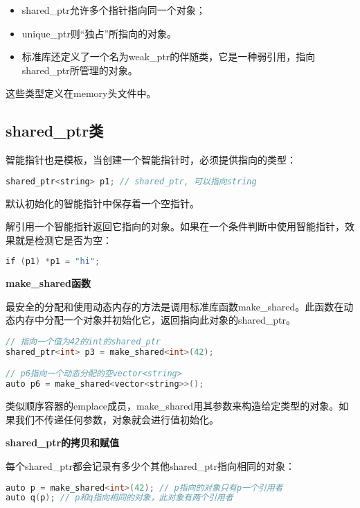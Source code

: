 \documentclass[
  a4paper,
  oneside,tablecaptionabove
]{scrbook}
\begin{document}
\begin{itemize}
\item
  shared\_ptr允许多个指针指向同一个对象；
\item
  unique\_ptr则\enquote{独占}所指向的对象。
\item
  标准库还定义了一个名为weak\_ptr的伴随类，它是一种弱引用，指向shared\_ptr所管理的对象。
\end{itemize}

这些类型定义在memory头文件中。

\subsection{shared\_ptr类}\label{shared_ptrux7c7b}

智能指针也是模板，当创建一个智能指针时，必须提供指向的类型：

\begin{lstlisting}[language={C++}]
shared_ptr<string> p1; // shared_ptr, 可以指向string
\end{lstlisting}

默认初始化的智能指针中保存着一个空指针。

解引用一个智能指针返回它指向的对象。如果在一个条件判断中使用智能指针，效果就是检测它是否为空：

\begin{lstlisting}[language={C++}]
if (p1) *p1 = "hi";
\end{lstlisting}

\textbf{make\_shared函数}

最安全的分配和使用动态内存的方法是调用标准库函数make\_shared。此函数在动态内存中分配一个对象并初始化它，返回指向此对象的shared\_ptr。

\begin{lstlisting}[language={C++}]
// 指向一个值为42的int的shared_ptr
shared_ptr<int> p3 = make_shared<int>(42);

// p6指向一个动态分配的空vector<string>
auto p6 = make_shared<vector<string>>();
\end{lstlisting}

类似顺序容器的emplace成员，make\_shared用其参数来构造给定类型的对象。如果我们不传递任何参数，对象就会进行值初始化。

\textbf{shared\_ptr的拷贝和赋值}

每个shared\_ptr都会记录有多少个其他shared\_ptr指向相同的对象：

\begin{lstlisting}[language={C++}]
auto p = make_shared<int>(42); // p指向的对象只有p一个引用者
auto q(p); // p和q指向相同的对象，此对象有两个引用者
\end{lstlisting}
\end{document}

